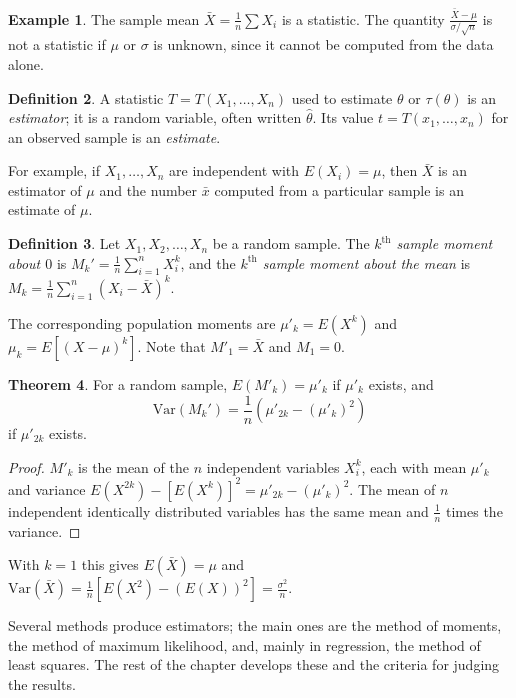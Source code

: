 \documentclass[12pt,a4paper]{report}
\theoremstyle{definition}
\newtheorem{thm}{Theorem}[section]
\newtheorem{definition}[thm]{Definition}
\newtheorem{example}[thm]{Example}
\theoremstyle{plain}
\begin{document}
\begin{example}
\label{ex:statistic}
The sample mean $\bar{X} = \frac{1}{n}\sum X_i$ is a statistic. The quantity
$\frac{\bar{X} - \mu}{\sigma / \sqrt{n}}$ is not a statistic if $\mu$ or $\sigma$
is unknown, since it cannot be computed from the data alone.
\end{example}

\begin{definition}
\label{def:estimator}
A statistic $T = T(X_1,\dots,X_n)$ used to estimate $\theta$ or $\tau(\theta)$ is
an \emph{estimator}; it is a random variable, often written $\hat\theta$. Its
value $t = T(x_1, \dots, x_n)$ for an observed sample is an \emph{estimate}.
\end{definition}

For example, if $X_1,\dots,X_n$ are independent with $E(X_i) = \mu$, then
$\bar{X}$ is an estimator of $\mu$ and the number $\bar{x}$ computed from a
particular sample is an estimate of $\mu$.

\begin{definition}
\label{def:samplemoments}
Let $X_1, X_2, \dots , X_n$ be a random sample. The \emph{$k^{\text{th}}$ sample
moment about $0$} is $M_k' = \frac{1}{n}\sum^n_{i =1}X^k_i$, and the
\emph{$k^{\text{th}}$ sample moment about the mean} is
$M_k = \frac{1}{n}\sum^n_{i = 1}(X_i - \bar{X})^k$.
\end{definition}

The corresponding population moments are $\mu'_k = E(X^k)$ and
$\mu_k = E\left[(X - \mu)^k\right]$. Note that $M'_1 = \bar{X}$ and $M_1 = 0$.

\begin{thm}
\label{thm:samplemoments}
For a random sample, $E(M'_k) = \mu'_k$ if $\mu'_k$ exists, and
\[\text{Var}(M_k') = \frac{1}{n}\left(\mu'_{2k} - (\mu'_k)^2\right)\]
if $\mu'_{2k}$ exists.
\end{thm}

\begin{proof}
$M'_k$ is the mean of the $n$ independent variables $X_i^k$, each with mean
$\mu'_k$ and variance $E(X^{2k}) - [E(X^k)]^2 = \mu'_{2k} - (\mu'_k)^2$. The mean
of $n$ independent identically distributed variables has the same mean and
$\frac1n$ times the variance.
\end{proof}

With $k = 1$ this gives $E(\bar X) = \mu$ and
$\text{Var}(\bar X) = \frac1n\left[E(X^2) - (E(X))^2\right] = \frac{\sigma^2}{n}$.

Several methods produce estimators; the main ones are the method of moments, the
method of maximum likelihood, and, mainly in regression, the method of least
squares. The rest of the chapter develops these and the criteria for judging the
results.
\end{document}
